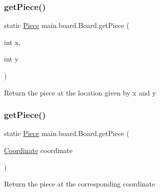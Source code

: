 \hypertarget{classmain_1_1board_1_1_board_a9178b1987ef4e40bb5db5f42bc9179e4}{}\label{classmain_1_1board_1_1_board_a9178b1987ef4e40bb5db5f42bc9179e4} 
\subsubsection{\texorpdfstring{get\+Piece()}{getPiece()}\hspace{0.1cm}{\footnotesize\ttfamily [1/2]}}
{\footnotesize\ttfamily static \hyperlink{classmain_1_1pieces_1_1_piece}{Piece} main.\+board.\+Board.\+get\+Piece (\begin{DoxyParamCaption}\item[{int}]{x,  }\item[{int}]{y }\end{DoxyParamCaption})\hspace{0.3cm}{\ttfamily [static]}}

Return the piece at the location given by x and y \hypertarget{classmain_1_1board_1_1_board_a662523cfc4cf13e80816e075fd6bd2cd}{}\label{classmain_1_1board_1_1_board_a662523cfc4cf13e80816e075fd6bd2cd} 
\subsubsection{\texorpdfstring{get\+Piece()}{getPiece()}\hspace{0.1cm}{\footnotesize\ttfamily [2/2]}}
{\footnotesize\ttfamily static \hyperlink{classmain_1_1pieces_1_1_piece}{Piece} main.\+board.\+Board.\+get\+Piece (\begin{DoxyParamCaption}\item[{\hyperlink{classmain_1_1board_1_1_coordinate}{Coordinate}}]{coordinate }\end{DoxyParamCaption})\hspace{0.3cm}{\ttfamily [static]}}

Return the piece at the corresponding coordinate \hypertarget{classmain_1_1board_1_1_board_a3cf270f460073b76eb22f351b8601dc9}{}\label{classmain_1_1board_1_1_board_a3cf270f460073b76eb22f351b8601dc9} 
